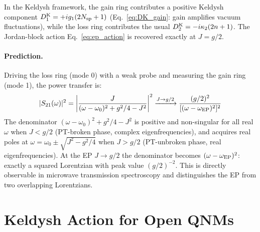 \documentclass[12pt]{article}
\newcommand{\Keldysh}{{\rm K}}
\newcommand{\EP}{{\rm EP}}
\begin{document}
In the Keldysh framework, the gain ring contributes a positive Keldysh
component $D_1^\Keldysh=+ig_1(2N_{\rm sp}+1)$ (Eq.~\ref{eq:DK_gain}:
gain amplifies vacuum fluctuations), while the loss ring contributes the usual
$D_2^\Keldysh=-i\kappa_2(2n+1)$.  The Jordan-block action
Eq.~\eqref{eq:ep_action} is recovered exactly at $J=g/2$.

\paragraph{Prediction.}  Driving the loss ring (mode 0) with a weak probe
and measuring the gain ring (mode 1), the power transfer is:
\begin{equation}
  |S_{21}(\omega)|^2 = \left|\frac{J}{(\omega-\omega_0)^2+g^2/4-J^2}\right|^2
  \xrightarrow{J\to g/2}
  \frac{(g/2)^2}{[(\omega-\omega_\EP)^2]^2}
  \label{eq:pt_transfer}
\end{equation}
The denominator $(\omega-\omega_0)^2 + g^2/4 - J^2$ is positive and
non-singular for all real $\omega$ when $J < g/2$ (PT-broken phase,
complex eigenfrequencies), and acquires real poles at
$\omega = \omega_0 \pm \sqrt{J^2-g^2/4}$ when $J > g/2$
(PT-unbroken phase, real eigenfrequencies).  At the EP $J\to g/2$
the denominator becomes $(\omega-\omega_\EP)^2$: exactly a squared
Lorentzian with peak value $(g/2)^{-2}$.  This is directly
observable in microwave transmission spectroscopy and distinguishes the
EP from two overlapping Lorentzians.

\section{Keldysh Action for Open QNMs}
\label{sec:keldysh}
\end{document}
